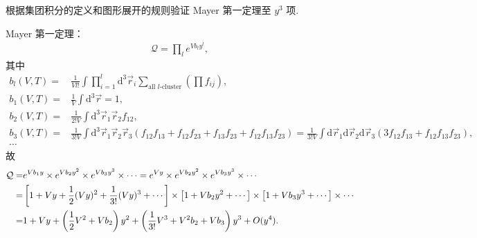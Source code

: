 \documentclass{assignment}
\begin{document}
\begin{prob}
    根据集团积分的定义和图形展开的规则验证 Mayer 第一定理至 $y^3$ 项.
\end{prob}
\begin{pf}
    Mayer 第一定理：
    \begin{align}
        \mathcal{Q}=\prod_le^{Vb_ly^l},
    \end{align}
    其中
    \begin{align}
        b_l(V,T)=&\frac{1}{Vl!}\int\prod_{i=1}^l\mathrm{d}^3\vec{r}_i\sum_{\text{all $l$-cluster}}\left(\prod f_{ij}\right),\\
        b_1(V,T)=&\frac{1}{V}\int\mathrm{d}^3\vec{r}=1,\\
        b_2(V,T)=&\frac{1}{2!V}\int\mathrm{d}^3\vec{r}_1\vec{r}_2f_{12},\\
        b_3(V,T)=&\frac{1}{3!V}\int\mathrm{d}^3\vec{r}_1\vec{r}_2\vec{r}_3(f_{12}f_{13}+f_{12}f_{23}+f_{13}f_{23}+f_{12}f_{13}f_{23})=\frac{1}{3!V}\int\mathrm{d}\vec{r}_1\mathrm{d}\vec{r}_2\mathrm{d}\vec{r}_3(3f_{12}f_{13}+f_{12}f_{13}f_{23}),\\
        \cdots&
    \end{align}
    故
    \begin{align}
        \notag\mathcal{Q}=&e^{Vb_1y}\times e^{Vb_2y^2}\times e^{Vb_3y^3}\times\cdots=e^{Vy}\times e^{Vb_2y^2}\times e^{Vb_3y^3}\times\cdots\\
        \notag=&\left[1+Vy+\frac{1}{2}(Vy)^2+\frac{1}{3!}(Vy)^3+\cdots\right]\times\left[1+Vb_2y^2+\cdots\right]\times\left[1+Vb_3y^3+\cdots\right]\times\cdots\\
        =&1+Vy+\left(\frac{1}{2}V^2+Vb_2\right)y^2+\left(\frac{1}{3!}V^3+V^2b_2+Vb_3\right)y^3+O(y^4).
    \end{align}
\end{pf}
\end{document}
